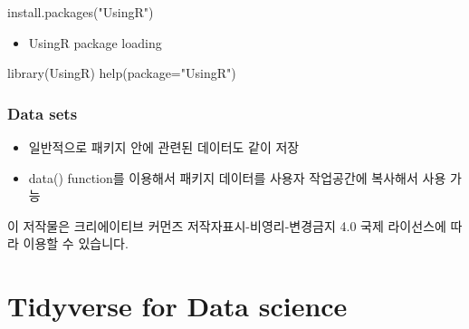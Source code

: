 \documentclass[
]{book}
\newenvironment{Shaded}{\begin{snugshade}}{\end{snugshade}}
\newcommand{\AttributeTok}[1]{\textcolor[rgb]{0.77,0.63,0.00}{#1}}
\newcommand{\FunctionTok}[1]{\textcolor[rgb]{0.00,0.00,0.00}{#1}}
\newcommand{\NormalTok}[1]{#1}
\newcommand{\SpecialCharTok}[1]{\textcolor[rgb]{0.00,0.00,0.00}{#1}}
\newcommand{\StringTok}[1]{\textcolor[rgb]{0.31,0.60,0.02}{#1}}
\providecommand{\tightlist}{%
  \setlength{\itemsep}{0pt}\setlength{\parskip}{0pt}}
\begin{document}
\begin{Shaded}
\begin{Highlighting}[]
\FunctionTok{install.packages}\NormalTok{(}\StringTok{"UsingR"}\NormalTok{)}
\end{Highlighting}
\end{Shaded}

\begin{itemize}
\tightlist
\item
  UsingR package loading
\end{itemize}

\begin{Shaded}
\begin{Highlighting}[]
\FunctionTok{library}\NormalTok{(UsingR)}
\FunctionTok{help}\NormalTok{(}\AttributeTok{package=}\StringTok{"UsingR"}\NormalTok{)}
\end{Highlighting}
\end{Shaded}

\hypertarget{data-sets}{%
\subsection{Data sets}\label{data-sets}}

\begin{itemize}
\tightlist
\item
  일반적으로 패키지 안에 관련된 데이터도 같이 저장
\item
  data() function를 이용해서 패키지 데이터를 사용자 작업공간에 복사해서 사용 가능
\end{itemize}

\begin{Shaded}
\end{Shaded}

이 저작물은 크리에이티브 커먼즈 저작자표시-비영리-변경금지 4.0 국제 라이선스에 따라 이용할 수 있습니다.

\hypertarget{tidyverse-for-data-science}{%
\chapter{Tidyverse for Data science}\label{tidyverse-for-data-science}}
\end{document}

